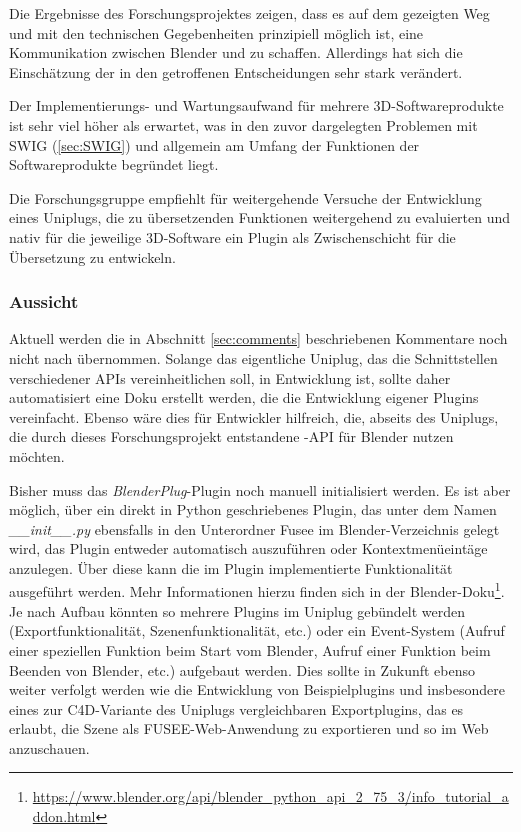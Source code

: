 
Die Ergebnisse des Forschungsprojektes zeigen, dass es auf dem gezeigten Weg und mit den technischen Gegebenheiten prinzipiell möglich ist, eine Kommunikation zwischen Blender und \CS zu schaffen. Allerdings hat sich die Einschätzung der in den  getroffenen Entscheidungen sehr stark verändert.

Der Implementierungs- und Wartungsaufwand für mehrere 3D-Softwareprodukte ist sehr viel höher als erwartet, was in den zuvor dargelegten Problemen mit SWIG (\ref{sec:SWIG}) und allgemein am Umfang der Funktionen der Softwareprodukte begründet liegt.

Die Forschungsgruppe empfiehlt für weitergehende Versuche der Entwicklung eines Uniplugs, die zu übersetzenden Funktionen weitergehend zu evaluierten und nativ für die jeweilige 3D-Software ein Plugin als Zwischenschicht für die Übersetzung zu entwickeln.



\subsubsection{Aussicht}

Aktuell werden die in Abschnitt \ref{sec:comments} beschriebenen Kommentare noch nicht nach \CS übernommen. Solange das eigentliche Uniplug, das die Schnittstellen verschiedener APIs vereinheitlichen soll, in Entwicklung ist, sollte daher automatisiert eine Doku erstellt werden, die die Entwicklung eigener Plugins vereinfacht. Ebenso wäre dies für Entwickler hilfreich, die, abseits des Uniplugs, die durch dieses Forschungsprojekt entstandene \CC-API für Blender nutzen möchten.

Bisher muss das \emph{BlenderPlug}-Plugin noch manuell initialisiert werden. Es ist aber möglich, über ein direkt in Python geschriebenes Plugin, das unter dem Namen \emph{\_\_init\_\_.py} ebensfalls in den Unterordner Fusee im Blender-Verzeichnis gelegt wird, das Plugin entweder automatisch auszuführen oder Kontextmenüeintäge anzulegen. Über diese kann die im Plugin implementierte Funktionalität ausgeführt werden. Mehr Informationen hierzu finden sich in der Blender-Doku\footnote{\url{https://www.blender.org/api/blender_python_api_2_75_3/info_tutorial_addon.html}}. Je nach Aufbau könnten so mehrere Plugins im Uniplug gebündelt werden (Exportfunktionalität, Szenenfunktionalität, etc.) oder ein Event-System (Aufruf einer speziellen Funktion beim Start vom Blender, Aufruf einer Funktion beim Beenden von Blender, etc.) aufgebaut werden. Dies sollte in Zukunft ebenso weiter verfolgt werden wie die Entwicklung von Beispielplugins und insbesondere eines zur C4D-Variante des Uniplugs vergleichbaren Exportplugins, das es erlaubt, die Szene als FUSEE-Web-Anwendung zu exportieren und so im Web anzuschauen.

